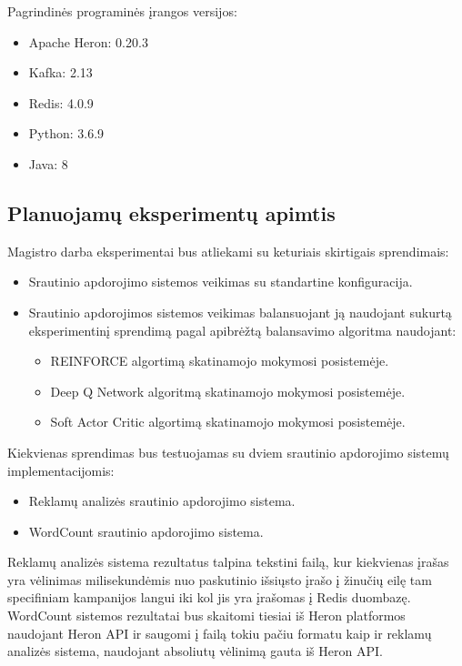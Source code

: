 \documentclass{VUMIFPSbakalaurinis}
\begin{document}
Pagrindinės programinės įrangos versijos:
\begin{itemize}
    \item Apache Heron: 0.20.3
    \item Kafka: 2.13
    \item Redis: 4.0.9
    \item Python: 3.6.9
    \item Java: 8
\end{itemize}
\subsection{Planuojamų eksperimentų apimtis}

Magistro darba eksperimentai bus atliekami su keturiais skirtigais sprendimais:
\begin{itemize}
    \item Srautinio apdorojimo sistemos veikimas su standartine konfiguracija.
    \item Srautinio apdorojimos sistemos veikimas balansuojant ją naudojant sukurtą eksperimentinį sprendimą pagal apibrėžtą balansavimo algoritma naudojant:
    \begin{itemize}
        \item REINFORCE algortimą skatinamojo mokymosi posistemėje.
        \item Deep Q Network algoritmą skatinamojo mokymosi posistemėje.
        \item Soft Actor Critic algortimą skatinamojo mokymosi posistemėje.
    \end{itemize}
\end{itemize}

Kiekvienas sprendimas bus testuojamas su dviem srautinio apdorojimo sistemų implementacijomis:
\begin{itemize}
    \item Reklamų analizės srautinio apdorojimo sistema.
    \item WordCount srautinio apdorojimo sistema.
\end{itemize}

Reklamų analizės sistema rezultatus talpina tekstini failą, kur kiekvienas įrašas yra vėlinimas milisekundėmis nuo paskutinio išsiųsto įrašo į žinučių eilę tam specifiniam kampanijos langui iki kol jis yra įrašomas į Redis duombazę. WordCount sistemos rezultatai bus skaitomi tiesiai iš Heron platformos naudojant Heron API ir saugomi į failą tokiu pačiu formatu kaip ir reklamų analizės sistema, naudojant absoliutų vėlinimą gauta iš Heron API. 
\end{document}
